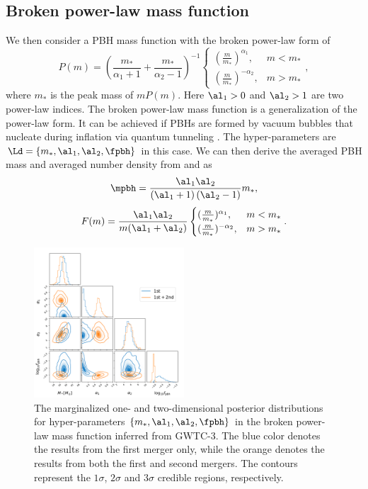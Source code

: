 \documentclass[
reprint,           %
superscriptaddress,%
amsmath,           %
amssymb,           %
aps,               %
prd,               %
notitlepage,       %
longbibliography,  %
floatfix,          %
nofootinbib,
]{revtex4-1}
\def\({\left(}
\def\){\right)}
\def\e{\begin{equation}}
\def\q{\end{equation}}
\begin{document}
\subsection{Broken power-law mass function}
We then consider a PBH mass function with the broken power-law form of \cite{Deng:2021ezy}
\begin{equation}
	P(m)= \left(\frac{m_*}{\alpha_1+1} + \frac{m_*}{\alpha_2-1}\right)^{-1} \begin{cases} (\frac{m}{m_*})^{\alpha_1}, & m<m_* \\ (\frac{m}{m_*})^{-\alpha_2}, & m>m_*\end{cases},
\end{equation}
where $m_*$ is the peak mass of $m P(m)$. Here $\al_1>0$ and $\al_2>1$ are two power-law indices. The broken power-law mass function is a generalization of the power-law form. It can be achieved if PBHs are formed by vacuum bubbles that nucleate during inflation via quantum tunneling \cite{Deng:2021ezy}.
The hyper-parameters are $\Ld = \{m_*, \al_1, \al_2, \fpbh\}$ in this case. 
We can then derive the averaged PBH mass and averaged number density from  and  as
\e
\mpbh = \frac{\al_1 \al_2}{\(\al_1 +1\)\(\al_2 -1\)} m_*,
\q
\e 
F(m) = \frac{\al_1 \al_2}{m(\al_1 + \al_2)} \begin{cases} (\frac{m}{m_*})^{\alpha_1}, & m<m_* \\ (\frac{m}{m_*})^{-\alpha_2}, & m>m_*\end{cases}.
\q

\begin{figure}[tbp!]
	\centering
	\includegraphics[width=0.5\textwidth]{post-bpower.pdf}
	\caption{\label{posterior-bpower}The marginalized one- and two-dimensional posterior distributions for hyper-parameters $\{m_*, \al_1, \al_2, \fpbh\}$ in the broken power-law mass function inferred from GWTC-3. The blue color denotes the results from the first merger only, while the orange denotes the results from both the first and second mergers. The contours represent the $1\sigma$, $2\sigma$ and $3\sigma$ credible regions, respectively.}
\end{figure}
\end{document}
